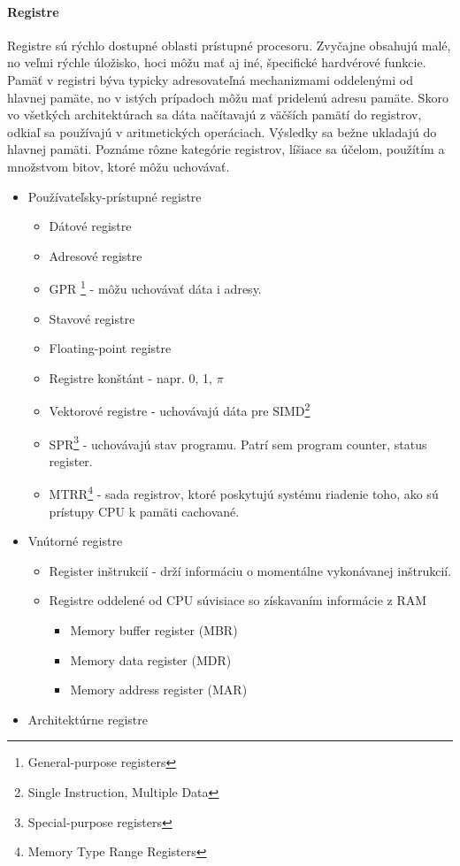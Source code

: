 \documentclass[11pt,a4paper]{report}
\begin{document}
\paragraph{Registre} Registre  sú rýchlo dostupné oblasti prístupné procesoru. Zvyčajne obsahujú malé, no veľmi rýchle úložisko, hoci môžu mať aj iné, špecifické hardvérové funkcie. Pamäť v registri býva typicky adresovateľná mechanizmami oddelenými od hlavnej pamäte, no v istých prípadoch môžu mať pridelenú adresu pamäte. Skoro vo všetkých architektúrach sa dáta načítavajú z väčších pamätí do registrov, odkiaľ sa používajú v aritmetických operáciach. Výsledky sa bežne ukladajú do hlavnej pamäti. Poznáme rôzne kategórie registrov, líšiace sa účelom, použítím a množstvom bitov, ktoré môžu uchovávať.

\begin{itemize}
\item Používateľsky-prístupné registre 
      \begin{itemize}
      \item Dátové registre
      \item Adresové registre
      \item GPR \footnote{General-purpose registers} - môžu uchovávať dáta i adresy.
      \item Stavové registre
      \item Floating-point registre
      \item Registre konštánt - napr. 0, 1, $\pi$
      \item Vektorové registre - uchovávajú dáta pre SIMD\footnote{Single Instruction, Multiple Data}
      \item SPR\footnote{Special-purpose registers} - uchovávajú stav programu. Patrí sem program counter, status register.
      \item MTRR\footnote{Memory Type Range Registers} - sada registrov, ktoré poskytujú systému riadenie toho, ako sú prístupy CPU k pamäti cachované. 
      \end{itemize}
\item Vnútorné registre
\begin{itemize}
\item Register inštrukcií - drží informáciu o momentálne vykonávanej inštrukcií.
\item Registre oddelené od CPU súvisiace so získavaním informácie z RAM
\begin{itemize}
\item Memory buffer register (MBR)
\item Memory data register (MDR)
\item Memory address register (MAR)
\end{itemize}
\end{itemize}
\item Architektúrne registre
\end{itemize} 
\end{document}

